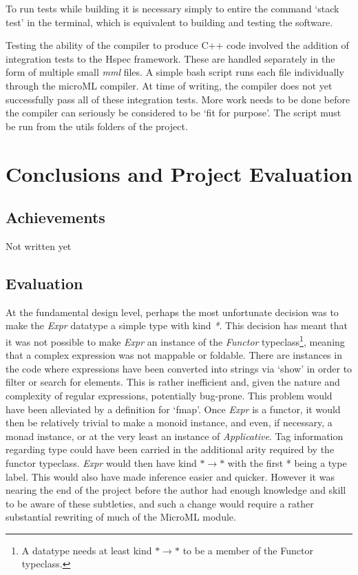 \documentclass[12pt, a4paper]{report}
\begin{document}
To run tests while building it is necessary simply to entire the command `stack test' in the
terminal, which is equivalent to building and testing the software.

Testing the ability of the compiler to produce C++ code involved the addition of integration tests
to the Hspec framework. These are handled separately in the form of multiple small \textit{mml}
files. A simple bash script runs each file individually through the microML compiler. At time of
writing, the compiler does not yet successfully pass all of these integration tests. More work needs
to be done before the compiler can seriously be considered to be `fit for purpose'. The script must
be run from the utils folders of the project.

\chapter{Conclusions and Project Evaluation}

\section{Achievements}
Not written yet

\section{Evaluation}
At the fundamental design level, perhaps the most unfortunate decision was to make the \textit{Expr}
datatype a simple type with kind \textit{*}. This decision has meant that it was not possible to
make \textit{Expr} an instance of the \textit{Functor} typeclass\footnote{A datatype needs at least
kind $ * \rightarrow * $ to be a member of the Functor typeclass.}, meaning that a complex
expression was not mappable or foldable. There are instances in the code where expressions have been
converted into strings via `show' in order to filter or search for elements. This is rather
inefficient and, given the nature and complexity of regular expressions, potentially bug-prone. This
problem would have been alleviated by a definition for `fmap'. Once \textit{Expr} is a functor, it
would then be relatively trivial to make a monoid instance, and even, if necessary, a monad
instance, or at the very least an instance of \textit{Applicative}. Tag information regarding type
could have been carried in the additional arity required by the functor typeclass. \textit{Expr}
would then have kind $ * \rightarrow * $ with the first * being a type label. This would also have
made inference easier and quicker. However it was nearing the end of the project before the author
had enough knowledge and skill to be aware of these subtleties, and such a change would require a
rather substantial rewriting of much of the MicroML module.
\end{document}
